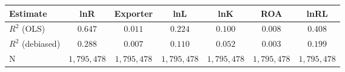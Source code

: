 \begin{tabular}{l*{6}{c}}
\hline\hline
 Estimate & lnR & Exporter & lnL & lnK & ROA & lnRL \\
\hline
\addlinespace $ R^2$ (OLS) & $0.647$ & $0.011$ & $0.224$ & $0.100$ & $0.008$ & $0.408$ \\
$ R^2$ (debiased) & $0.288$ & $0.007$ & $0.110$ & $0.052$ & $0.003$ & $0.199$ \\
N & $1,795,478$ & $1,795,478$ & $1,795,478$ & $1,795,478$ & $1,795,478$ & $1,795,478$ \\
\hline\hline
\end{tabular}
